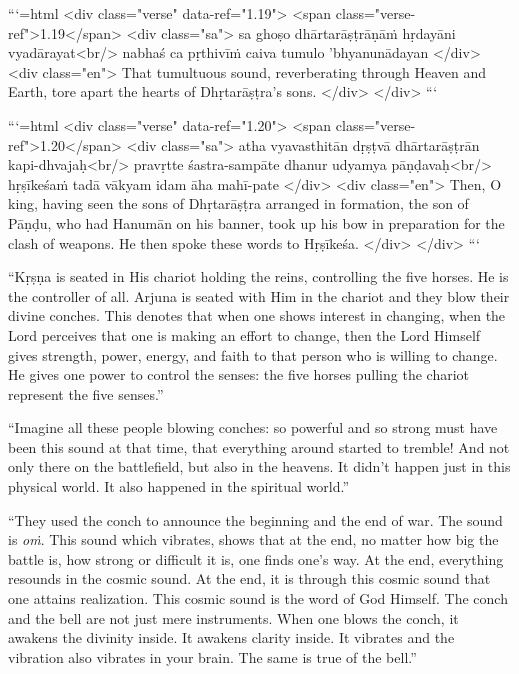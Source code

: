 ```{=html}
<div class="verse" data-ref="1.19">
  <span class="verse-ref">1.19</span>
  <div class="sa">
    sa ghoṣo dhārtarāṣṭrāṇāṁ hṛdayāni vyadārayat<br/>
    nabhaś ca pṛthivīṁ caiva tumulo ’bhyanunādayan
  </div>
  <div class="en">
    That tumultuous sound, reverberating through Heaven and Earth, tore apart the hearts of Dhṛtarāṣṭra’s sons.
  </div>
</div>
```



```{=html}
<div class="verse" data-ref="1.20">
  <span class="verse-ref">1.20</span>
  <div class="sa">
    atha vyavasthitān dṛṣṭvā dhārtarāṣṭrān kapi-dhvajaḥ<br/>
    pravṛtte śastra-sampāte dhanur udyamya pāṇḍavaḥ<br/>
    hṛṣīkeśaṁ tadā vākyam idam āha mahī-pate
  </div>
  <div class="en">
    Then, O king, having seen the sons of Dhṛtarāṣṭra arranged in formation, the son of Pāṇḍu, who had Hanumān on his banner, took up his bow in preparation for the clash of weapons. He then spoke these words to Hṛṣīkeśa.
  </div>
</div>
```



\enquote{Kṛṣṇa is seated in His chariot holding the reins, controlling the five horses. He is the controller of all. Arjuna is seated with Him in the chariot and they blow their divine conches. This denotes that when one shows interest in changing, when the Lord perceives that one is making an effort to change, then the Lord Himself gives strength, power, energy, and faith to that person who is willing to change. He gives one power to control the senses: the five horses pulling the chariot represent the five senses.}

\enquote{Imagine all these people blowing conches: so powerful and so strong must have been this sound at that time, that everything around started to tremble! And not only there on the battlefield, but also in the heavens. It didn’t happen just in this physical world. It also happened in the spiritual world.}


\enquote{They used the conch to announce the beginning and the end of war. The sound is \textit{oṁ}. This sound which vibrates, shows that at the end, no matter how big the battle is, how strong or difficult it is, one finds one’s way. At the end, everything resounds in the cosmic sound. At the end, it is through this cosmic sound that one attains realization. This cosmic sound is the word of God Himself. The conch and the bell are not just mere instruments. When one blows the conch, it awakens the divinity inside. It awakens clarity inside. It vibrates and the vibration also vibrates in your brain. The same is true of the bell.}

